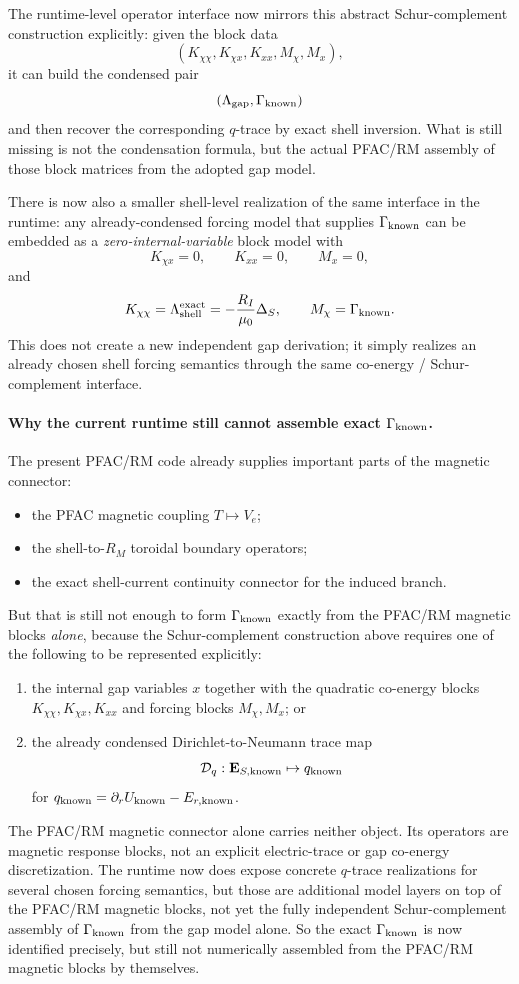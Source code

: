 \documentclass[11pt,a4paper]{article}
\begin{document}
The runtime-level operator interface now mirrors this abstract
Schur-complement construction explicitly: given the block data
\[
(K_{\chi\chi},K_{\chi x},K_{xx},M_\chi,M_x),
\]
it can build the condensed pair
\[
(\Lambda_{\rm gap},\Gamma_{\rm known})
\]
and then recover the corresponding \(q\)-trace by exact shell inversion. What
is still missing is not the condensation formula, but the actual PFAC/RM
assembly of those block matrices from the adopted gap model.

There is now also a smaller shell-level realization of the same interface in
the runtime: any already-condensed forcing model that supplies
\(\Gamma_{\rm known}\) can be embedded as a \emph{zero-internal-variable}
block model with
\[
K_{\chi x}=0,\qquad K_{xx}=0,\qquad M_x=0,
\]
and
\[
K_{\chi\chi}=\Lambda_{\rm shell}^{\rm exact}
=-\frac{R_I}{\mu_0}\Delta_S,\qquad
M_\chi=\Gamma_{\rm known}.
\]
This does not create a new independent gap derivation; it simply realizes an
already chosen shell forcing semantics through the same co-energy /
Schur-complement interface.

\paragraph{Why the current runtime still cannot assemble exact
\(\Gamma_{\rm known}\).}
The present PFAC/RM code already supplies important parts of the magnetic
connector:
\begin{itemize}
\item the PFAC magnetic coupling \(T\mapsto V_e\);
\item the shell-to-\(R_M\) toroidal boundary operators;
\item the exact shell-current continuity connector for the induced branch.
\end{itemize}
But that is still not enough to form \(\Gamma_{\rm known}\) exactly from the
PFAC/RM magnetic blocks \emph{alone}, because
the Schur-complement construction above requires one of the following to be
represented explicitly:
\begin{enumerate}
\item the internal gap variables \(x\) together with the quadratic co-energy
blocks \(K_{\chi\chi},K_{\chi x},K_{xx}\) and forcing blocks
\(M_\chi,M_x\); or
\item the already condensed Dirichlet-to-Neumann trace map
\[
\mathcal D_q:\mathbf E_{S,\rm known}\mapsto q_{\rm known}
\]
for \(q_{\rm known}=\partial_r U_{\rm known}-E_{r,\rm known}\).
\end{enumerate}
The PFAC/RM magnetic connector alone carries neither object. Its operators are
magnetic response blocks, not an explicit electric-trace or gap co-energy
discretization. The runtime now does expose concrete \(q\)-trace realizations
for several chosen forcing semantics, but those are additional model layers on
top of the PFAC/RM magnetic blocks, not yet the fully independent
Schur-complement assembly of \(\Gamma_{\rm known}\) from the gap model alone.
So the exact \(\Gamma_{\rm known}\) is now identified precisely, but still not
numerically assembled from the PFAC/RM magnetic blocks by themselves.
\end{document}
